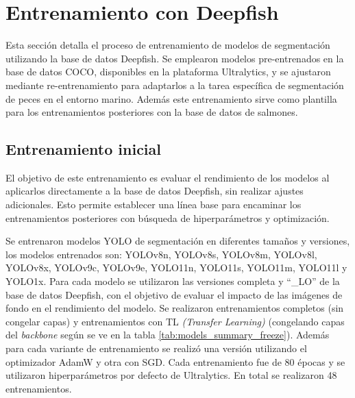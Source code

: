 \section{Entrenamiento con Deepfish}
Esta sección detalla el proceso de entrenamiento de modelos de segmentación utilizando la base de datos Deepfish. Se emplearon modelos pre-entrenados en la base de datos COCO, disponibles en la plataforma Ultralytics, y se ajustaron mediante re-entrenamiento para adaptarlos a la tarea específica de segmentación de peces en el entorno marino. Además este entrenamiento sirve como plantilla para los entrenamientos posteriores con la base de datos de salmones.

\subsection{Entrenamiento inicial}
\label{sec:entrenamientoDeepfish}
El objetivo de este entrenamiento es evaluar el rendimiento de los modelos al aplicarlos directamente a la base de datos Deepfish, sin realizar ajustes adicionales. Esto permite establecer una línea base para encaminar los entrenamientos posteriores con búsqueda de hiperparámetros y optimización.

Se entrenaron modelos YOLO de segmentación en diferentes tamaños y versiones, los modelos entrenados son: YOLOv8n, YOLOv8s, YOLOv8m, YOLOv8l, YOLOv8x, YOLOv9c, YOLOv9e, YOLO11n, YOLO11s, YOLO11m, YOLO11l y YOLO1x. Para cada modelo se utilizaron las versiones completa y ``_LO'' de la base de datos Deepfish, con el objetivo de evaluar el impacto de las imágenes de fondo en el rendimiento del modelo. Se realizaron entrenamientos completos (sin congelar capas) y entrenamientos con TL \textit{(Transfer Learning)} (congelando capas del \textit{backbone} según se ve en la tabla \ref{tab:models_summary_freeze}). Además para cada variante de entrenamiento se realizó una versión utilizando el optimizador AdamW y otra con SGD. Cada entrenamiento fue de 80 épocas y se utilizaron hiperparámetros por defecto de Ultralytics. En total se realizaron 48 entrenamientos.


